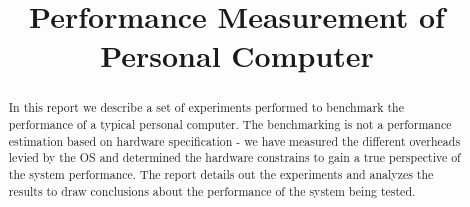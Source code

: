 \documentclass[conference]{IEEEtran}
\begin{document}
%
\title{Performance Measurement of Personal Computer}


\author{
\and
{}
}



\maketitle


\begin{abstract}

In this report we describe a set of experiments performed to benchmark the performance of a typical personal computer. The benchmarking is not a performance estimation based on hardware specification - we have measured the different overheads levied by the OS and determined the hardware constrains to gain a true perspective of the system performance. The report details out the experiments and analyzes the results to draw conclusions about the performance of the system being tested. 

\end{abstract}

\end{document}

